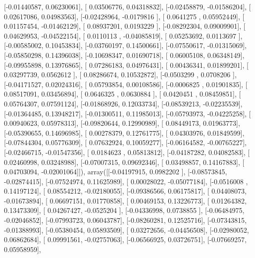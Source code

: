 \documentclass{article}
\begin{document}
       [-0.01440587,  0.06230061],
       [ 0.03506776,  0.04318832],
       [-0.02458879, -0.01586204],
       [ 0.02617086,  0.04983563],
       [-0.02428964, -0.0179816 ],
       [ 0.0641275 ,  0.05952449],
       [ 0.01157454, -0.01462129],
       [ 0.08937201,  0.0193229 ],
       [-0.08292304,  0.09009901],
       [ 0.04629953, -0.04522154],
       [ 0.0110113 , -0.04085819],
       [ 0.05253692,  0.0113697 ],
       [-0.00585002,  0.10453834],
       [-0.03760197,  0.14500661],
       [-0.07550617, -0.01315069],
       [-0.05850298,  0.14396038],
       [-0.10698347,  0.01690718],
       [ 0.06005108,  0.06348149],
       [-0.09955898,  0.13976865],
       [ 0.07286183,  0.04976431],
       [ 0.00436341,  0.01899201],
       [ 0.03297739,  0.0562612 ],
       [ 0.08286674,  0.10532872],
       [-0.0503299 ,  0.0708206 ],
       [-0.04171527,  0.02024316],
       [ 0.05793854,  0.00108586],
       [-0.0006825 ,  0.01901835],
       [ 0.08517091,  0.03456894],
       [ 0.0646325 ,  0.0630884 ],
       [ 0.0420451 ,  0.08459851],
       [ 0.05764307,  0.07591124],
       [-0.01868926,  0.12033734],
       [-0.08539213, -0.02235539],
       [-0.01364485,  0.13948217],
       [-0.01300511,  0.11985013],
       [-0.05793973, -0.04225258],
       [ 0.00940623,  0.05978313],
       [-0.09820644,  0.12990989],
       [ 0.08449173,  0.01963773],
       [-0.05390655,  0.14696985],
       [ 0.00278379,  0.12761775],
       [ 0.04303976,  0.01849599],
       [-0.07844304,  0.05776309],
       [ 0.07632924,  0.10059277],
       [-0.06164582, -0.00765227],
       [-0.02466715, -0.01547356],
       [ 0.0184623 ,  0.05813812],
       [-0.04187282,  0.04082583],
       [ 0.02460998,  0.03248988],
       [-0.07007315,  0.09692346],
       [ 0.03498857,  0.14167883],
       [ 0.04703094, -0.02001064]]), array([[-0.04197915,  0.0982202 ],
       [-0.08573845, -0.02874415],
       [-0.07524974,  0.11625989],
       [ 0.00028022, -0.05077184],
       [-0.0516008 ,  0.14197124],
       [ 0.08554212, -0.02180055],
       [-0.09386566,  0.06175817],
       [ 0.04408073, -0.01673894],
       [ 0.06697151,  0.01770858],
       [ 0.00469153,  0.13226773],
       [ 0.01264382,  0.13473309],
       [ 0.04267427, -0.0525204 ],
       [-0.04336998,  0.0738855 ],
       [-0.06484975, -0.02046852],
       [-0.07993723,  0.06043787],
       [-0.08260281,  0.12525716],
       [-0.07343815, -0.01388993],
       [-0.05380454,  0.05893509],
       [ 0.03272656, -0.04456508],
       [-0.02980052,  0.06862684],
       [ 0.09991561, -0.02757063],
       [-0.06566925,  0.03726751],
       [-0.07669257,  0.05958959],
\end{document}
